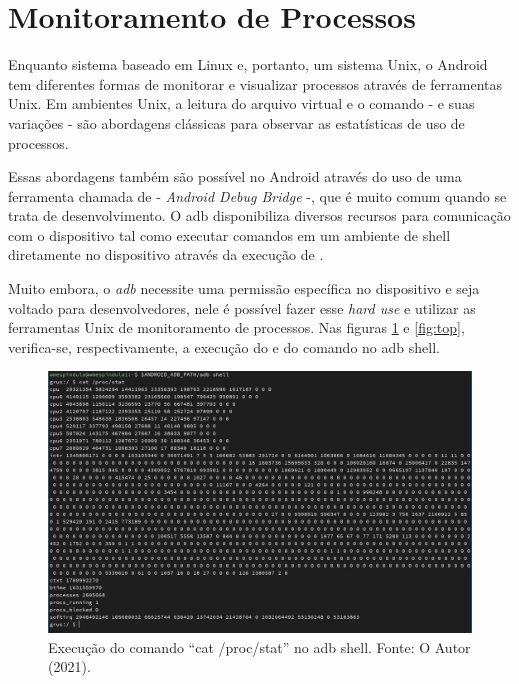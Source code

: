 \documentclass[12pt, a4paper]{article}
\newcommand{\tit}[1]{\textit{#1}}
\begin{document}
    
    
    \section{Monitoramento de Processos}
    Enquanto sistema baseado em Linux e, portanto, um sistema Unix, o Android tem diferentes formas de monitorar e visualizar processos através de ferramentas Unix. Em ambientes Unix, a leitura do arquivo virtual  e o comando  - e suas variações - são abordagens clássicas para observar as estatísticas de uso de processos. 
    
    Essas abordagens também são possível no Android através do uso de uma ferramenta chamada de  - \tit{Android Debug Bridge} -, que é muito comum quando se trata de desenvolvimento. O adb disponibiliza diversos recursos para comunicação com o dispositivo tal como executar comandos em um ambiente de shell diretamente no dispositivo através da execução de .
    
    Muito embora, o \tit{adb} necessite uma permissão específica no dispositivo e seja voltado para desenvolvedores, nele é possível fazer esse \tit{hard use} e utilizar as ferramentas Unix de monitoramento de processos.
    Nas figuras \ref{fig:catprocstat} e \ref{fig:top}, verifica-se, respectivamente, a execução do  e do comando  no adb shell.
    
    \begin{figure}[!ht]
        \centering
        \includegraphics[width=\textwidth,height=0.3\textheight,keepaspectratio]{adb-proc-stat.png}
        \caption{Execução do comando ``cat /proc/stat'' no adb shell. Fonte: O Autor (2021).}
        \label{fig:catprocstat}
    \end{figure}
    
\end{document}
